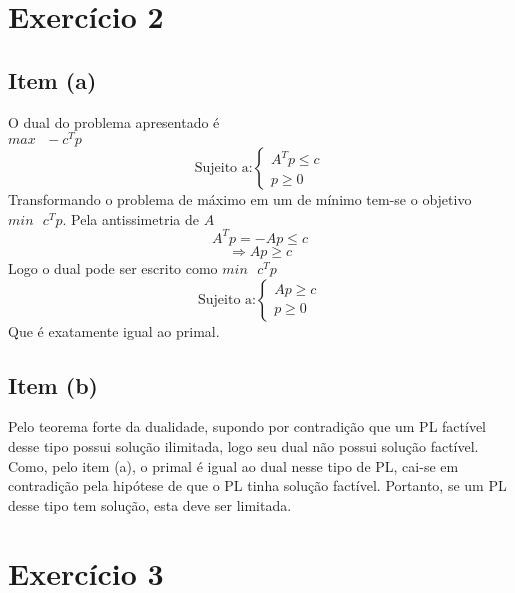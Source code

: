 \documentclass[a4paper, 12pt]{article}
\begin{document}
\section{Exercício 2}
\subsection{Item (a)}
O dual do problema apresentado é\\
$max\text{ }-c^Tp$
\[
\text{Sujeito a:}\left\{
\begin{array}{l}
A^Tp\leq c\\
p\geq 0
\end{array}
\right.
\]
Transformando o problema de máximo em um de mínimo tem-se o objetivo $min\text{ }c^Tp$. Pela antissimetria de $A$
\[
A^Tp=-Ap\leq c
\]
\[
\Rightarrow Ap\geq c
\]
Logo o dual pode ser escrito como
$min\text{ }c^Tp$
\[
\text{Sujeito a:}\left\{
\begin{array}{l}
Ap\geq c\\
p\geq 0
\end{array}
\right.
\]
Que é exatamente igual ao primal.
\subsection{Item (b)}
Pelo teorema forte da dualidade, supondo por contradição que um PL factível desse tipo possui solução ilimitada, logo seu dual não possui solução factível. Como, pelo item (a), o primal é igual ao dual nesse tipo de PL, cai-se em contradição pela hipótese de que o PL tinha solução factível. Portanto, se um PL desse tipo tem solução, esta deve ser limitada.
\section{Exercício 3}
\end{document}

